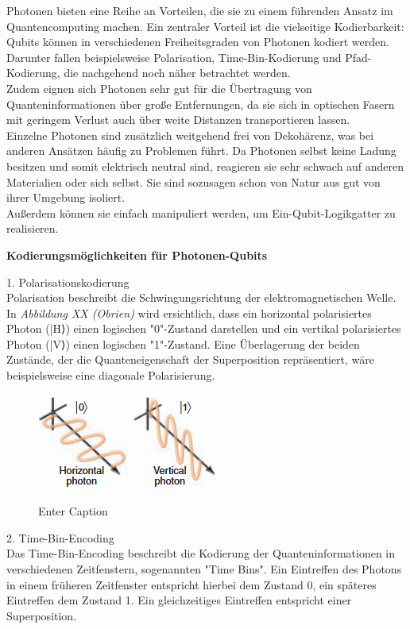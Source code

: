 Photonen bieten eine Reihe an Vorteilen, die sie zu einem führenden Ansatz im Quantencomputing machen. Ein zentraler Vorteil ist die vielseitige Kodierbarkeit: Qubits können in verschiedenen Freiheitsgraden von Photonen kodiert werden. Darunter fallen beispielsweise Polarisation, Time-Bin-Kodierung und Pfad-Kodierung, die nachgehend noch näher betrachtet werden. \\
Zudem eignen sich Photonen sehr gut für die Übertragung von Quanteninformationen über große Entfernungen, da sie sich in optischen Fasern mit geringem Verlust auch über weite Distanzen transportieren lassen. \\
Einzelne Photonen sind zusätzlich weitgehend frei von Dekohärenz, was bei anderen Ansätzen häufig zu Problemen führt. Da Photonen selbst keine Ladung besitzen und somit elektrisch neutral sind, reagieren sie sehr schwach auf anderen Materialien oder sich selbst. Sie sind sozusagen schon von Natur aus gut von ihrer Umgebung isoliert. \\
Außerdem können sie einfach manipuliert werden, um Ein-Qubit-Logikgatter zu realisieren. 

\textbf{Kodierungsmöglichkeiten für Photonen-Qubits}

1. Polarisationskodierung\\
Polarisation beschreibt die Schwingungsrichtung der elektromagnetischen Welle. In\textit{ Abbildung XX (Obrien)} wird ersichtlich, dass ein horizontal polarisiertes Photon (|H⟩) einen logischen "0"-Zustand darstellen und ein vertikal polarisiertes Photon (|V⟩) einen logischen "1"-Zustand. Eine Überlagerung der beiden Zustände, der die Quanteneigenschaft der Superposition repräsentiert, wäre beispielsweise eine diagonale Polarisierung. 
\begin{figure}
    \centering
    \includegraphics[width=0.5\linewidth]{images/physics/Photonen_Polarisierung.png}
    \caption{Enter Caption}
    \label{fig:enter-label}
\end{figure}
\cite{obrien_optical_2007}

2. Time-Bin-Encoding \\
Das Time-Bin-Encoding beschreibt die Kodierung der Quanteninformationen in verschiedenen Zeitfenstern, sogenannten "Time Bins". 
Ein Eintreffen des Photons in einem früheren Zeitfenster entspricht hierbei dem Zustand 0, ein späteres Eintreffen dem Zustand 1. Ein gleichzeitiges Eintreffen entspricht einer Superposition. \\ \cite{obrien_optical_2007}

